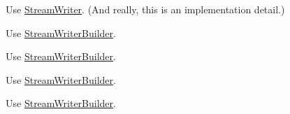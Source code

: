 
\begin{DoxyRefList}
\item[\label{deprecated__deprecated000007}%
\Hypertarget{deprecated__deprecated000007}%
Member \hyperlink{namespaceJson_a677dd20047c0c6e4eb16c5f1b53f703c}{Json\+:\+:J\+S\+O\+N\+C\+P\+P\+\_\+\+D\+E\+P\+R\+E\+C\+A\+T\+ED} (\char`\"{}\+Use Stream\+Writer instead\char`\"{}) J\+S\+O\+N\+\_\+\+A\+PI Writer]Use \hyperlink{classJson_1_1StreamWriter}{Stream\+Writer}. (And really, this is an implementation detail.)  
\item[\label{deprecated__deprecated000008}%
\Hypertarget{deprecated__deprecated000008}%
Member \hyperlink{namespaceJson_a9013c5f4f4ff260225b101a18af45262}{Json\+:\+:J\+S\+O\+N\+C\+P\+P\+\_\+\+D\+E\+P\+R\+E\+C\+A\+T\+ED} (\char`\"{}\+Use Stream\+Writer\+Builder instead\char`\"{}) J\+S\+O\+N\+\_\+\+A\+PI Styled\+Stream\+Writer]Use \hyperlink{classJson_1_1StreamWriterBuilder}{Stream\+Writer\+Builder}. 

Use \hyperlink{classJson_1_1StreamWriterBuilder}{Stream\+Writer\+Builder}. 

Use \hyperlink{classJson_1_1StreamWriterBuilder}{Stream\+Writer\+Builder}. 

Use \hyperlink{classJson_1_1StreamWriterBuilder}{Stream\+Writer\+Builder}. 


\end{DoxyRefList}
